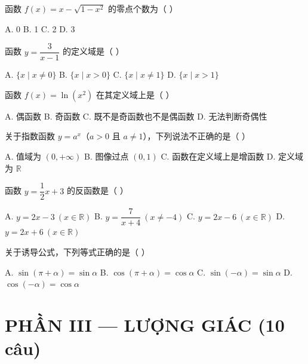 \documentclass[11pt, a4paper]{article}
\begin{document}
\begin{baitap}[6]
函数 $f(x)=x-\sqrt{1-x^2}$ 的零点个数为（ ）
\par\vspace{3pt}
\noindent A. 0 \quad B. 1 \quad C. 2 \quad D. 3
\end{baitap}

\begin{baitap}[7]
函数 $y=\dfrac{3}{x-1}$ 的定义域是（ ）
\par\vspace{3pt}
\noindent A. $\{x\mid x\ne0\}$ \quad B. $\{x\mid x>0\}$ \quad C. $\{x\mid x\ne1\}$ \quad D. $\{x\mid x>1\}$
\end{baitap}

\begin{baitap}[8]
函数 $f(x)=\ln(x^2)$ 在其定义域上是（ ）
\par\vspace{3pt}
\noindent A. 偶函数 \quad B. 奇函数 \quad C. 既不是奇函数也不是偶函数 \quad D. 无法判断奇偶性
\end{baitap}

\begin{baitap}[9]
关于指数函数 $y=a^x$（$a>0$ 且 $a\ne1$），下列说法不正确的是（ ）
\par\vspace{3pt}
\noindent A. 值域为 $(0,+\infty)$ \quad B. 图像过点 $(0,1)$ \quad C. 函数在定义域上是增函数 \quad D. 定义域为 $\mathbb{R}$
\end{baitap}

\begin{baitap}[10]
函数 $y=\dfrac{1}{2}x+3$ 的反函数是（ ）
\par\vspace{3pt}
\noindent A. $y=2x-3\ (x\in\mathbb{R})$ \quad B. $y=\dfrac{7}{x+4}\ (x\ne-4)$ \quad C. $y=2x-6\ (x\in\mathbb{R})$ \quad D. $y=2x+6\ (x\in\mathbb{R})$
\end{baitap}

\begin{baitap}[11]
关于诱导公式，下列等式正确的是（ ）
\par\vspace{3pt}
\noindent A. $\sin(\pi+\alpha)=\sin\alpha$ \quad B. $\cos(\pi+\alpha)=\cos\alpha$ \quad C. $\sin(-\alpha)=\sin\alpha$ \quad D. $\cos(-\alpha)=\cos\alpha$
\end{baitap}

\section{PHẦN III — LƯỢNG GIÁC (10 câu)}
\end{document}

